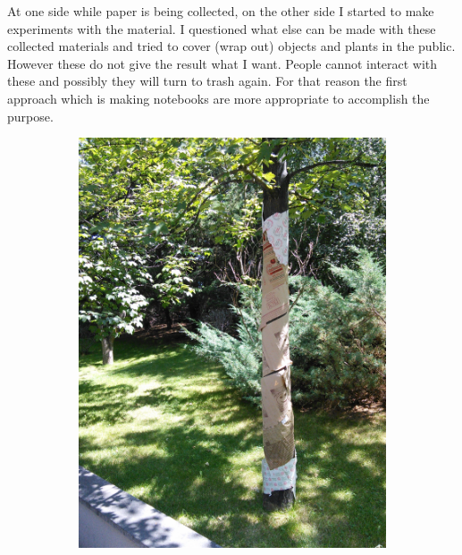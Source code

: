 
At one side while paper is being collected, on the other side I started to make experiments with the material. I questioned what else can be made with these collected materials and tried to cover (wrap out) objects and plants in the public. However these do not give the result what I want. People cannot interact with these and possibly they will turn to trash again. For that reason the first approach which is making notebooks are more appropriate to accomplish the purpose.

\begin{figure}
    \centering
    \begin{subfigure}[b]{0.47\textwidth}
        \includegraphics[width=\textwidth]{project_graphics/tree_experiment1.jpg}
    \end{subfigure}
    \begin{subfigure}[b]{0.47\textwidth}

\end{subfigure}
\end{figure}
